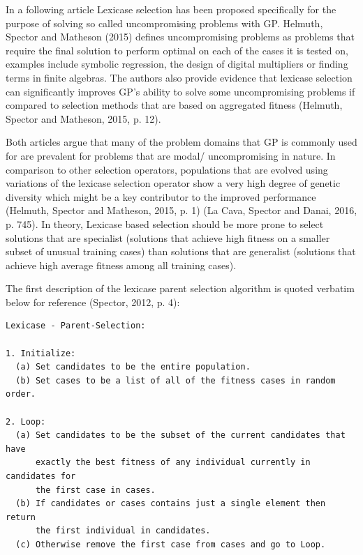 \documentclass[
  12pt,
]{article}
\begin{document}
In a following article Lexicase selection has been proposed specifically
for the purpose of solving so called uncompromising problems with GP.
Helmuth, Spector and Matheson (2015) defines uncompromising problems as
problems that require the final solution to perform optimal on each of
the cases it is tested on, examples include symbolic regression, the
design of digital multipliers or finding terms in finite algebras. The
authors also provide evidence that lexicase selection can significantly
improves GP's ability to solve some uncompromising problems if compared
to selection methods that are based on aggregated fitness (Helmuth,
Spector and Matheson, 2015, p. 12).

Both articles argue that many of the problem domains that GP is commonly
used for are prevalent for problems that are modal/ uncompromising in
nature. In comparison to other selection operators, populations that are
evolved using variations of the lexicase selection operator show a very
high degree of genetic diversity which might be a key contributor to the
improved performance (Helmuth, Spector and Matheson, 2015, p. 1) (La
Cava, Spector and Danai, 2016, p. 745). In theory, Lexicase based
selection should be more prone to select solutions that are specialist
(solutions that achieve high fitness on a smaller subset of unusual
training cases) than solutions that are generalist (solutions that
achieve high average fitness among all training cases).

The first description of the lexicase parent selection algorithm is
quoted verbatim below for reference (Spector, 2012, p. 4):

\begin{verbatim}
Lexicase - Parent-Selection:

1. Initialize:
  (a) Set candidates to be the entire population.
  (b) Set cases to be a list of all of the fitness cases in random order.

2. Loop:
  (a) Set candidates to be the subset of the current candidates that have 
      exactly the best fitness of any individual currently in candidates for 
      the first case in cases.
  (b) If candidates or cases contains just a single element then return
      the first individual in candidates.
  (c) Otherwise remove the first case from cases and go to Loop.
\end{verbatim}
\end{document}
